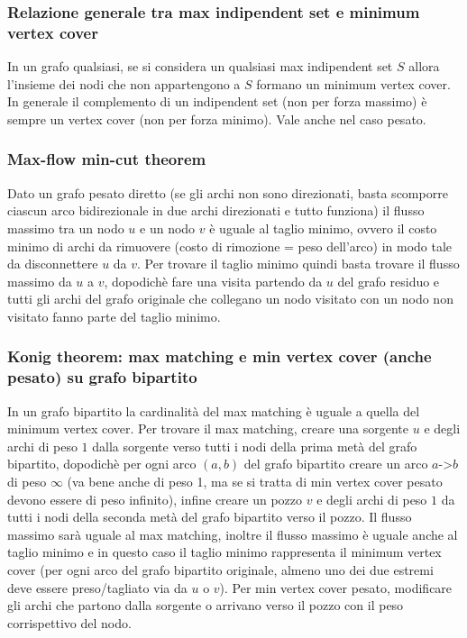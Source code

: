 \subsubsection{Relazione generale tra max indipendent set e minimum vertex cover}
In un grafo qualsiasi, se si considera un qualsiasi max indipendent set $S$ allora l'insieme dei nodi che non appartengono a $S$ formano un minimum vertex cover. In generale il complemento di un indipendent set (non per forza massimo) è sempre un vertex cover (non per forza minimo). Vale anche nel caso pesato.

\subsubsection{Max-flow min-cut theorem}
Dato un grafo pesato diretto (se gli archi non sono direzionati, basta scomporre ciascun arco bidirezionale in due archi direzionati e tutto funziona) il flusso massimo tra un nodo $u$ e un nodo $v$ è uguale al taglio minimo, ovvero il costo minimo di archi da rimuovere (costo di rimozione = peso dell'arco) in modo tale da disconnettere $u$ da $v$. Per trovare il taglio minimo quindi basta trovare il flusso massimo da $u$ a $v$, dopodichè fare una visita partendo da $u$ del grafo residuo e tutti gli archi del grafo originale che collegano un nodo visitato con un nodo non visitato fanno parte del taglio minimo.

\subsubsection{Konig theorem: max matching e min vertex cover (anche pesato) su grafo bipartito}
In un grafo bipartito la cardinalità del max matching è uguale a quella del minimum vertex cover. Per trovare il max matching, creare una sorgente $u$ e 
degli archi di peso $1$ dalla sorgente verso tutti i nodi della prima metà del grafo bipartito, dopodichè per ogni arco $(a,b)$ del grafo bipartito creare un arco $a$->$b$ di peso $\infty$ 
(va bene anche di peso 1, ma se si tratta di min vertex cover pesato devono essere di peso infinito), infine creare un pozzo $v$ e degli archi di peso $1$ da tutti i nodi della 
seconda metà del grafo bipartito verso il pozzo. Il flusso massimo sarà uguale al max matching, inoltre il flusso massimo è uguale anche al taglio minimo e in questo caso il taglio 
minimo rappresenta il minimum vertex cover (per ogni arco del grafo bipartito originale, almeno uno dei due estremi deve essere preso/tagliato via da $u$ o $v$). Per min vertex cover pesato, modificare gli archi che partono dalla sorgente o arrivano verso il pozzo con il peso corrispettivo del nodo.

